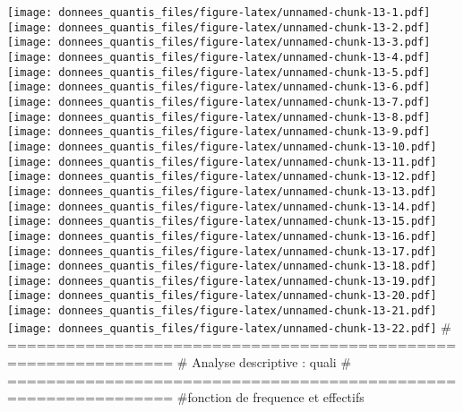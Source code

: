 \documentclass[
]{article}
\begin{document}
\texttt{[image: donnees\_quantis\_files/figure-latex/unnamed-chunk-13-1.pdf]}
\texttt{[image: donnees\_quantis\_files/figure-latex/unnamed-chunk-13-2.pdf]}
\texttt{[image: donnees\_quantis\_files/figure-latex/unnamed-chunk-13-3.pdf]}
\texttt{[image: donnees\_quantis\_files/figure-latex/unnamed-chunk-13-4.pdf]}
\texttt{[image: donnees\_quantis\_files/figure-latex/unnamed-chunk-13-5.pdf]}
\texttt{[image: donnees\_quantis\_files/figure-latex/unnamed-chunk-13-6.pdf]}
\texttt{[image: donnees\_quantis\_files/figure-latex/unnamed-chunk-13-7.pdf]}
\texttt{[image: donnees\_quantis\_files/figure-latex/unnamed-chunk-13-8.pdf]}
\texttt{[image: donnees\_quantis\_files/figure-latex/unnamed-chunk-13-9.pdf]}
\texttt{[image: donnees\_quantis\_files/figure-latex/unnamed-chunk-13-10.pdf]}
\texttt{[image: donnees\_quantis\_files/figure-latex/unnamed-chunk-13-11.pdf]}
\texttt{[image: donnees\_quantis\_files/figure-latex/unnamed-chunk-13-12.pdf]}
\texttt{[image: donnees\_quantis\_files/figure-latex/unnamed-chunk-13-13.pdf]}
\texttt{[image: donnees\_quantis\_files/figure-latex/unnamed-chunk-13-14.pdf]}
\texttt{[image: donnees\_quantis\_files/figure-latex/unnamed-chunk-13-15.pdf]}
\texttt{[image: donnees\_quantis\_files/figure-latex/unnamed-chunk-13-16.pdf]}
\texttt{[image: donnees\_quantis\_files/figure-latex/unnamed-chunk-13-17.pdf]}
\texttt{[image: donnees\_quantis\_files/figure-latex/unnamed-chunk-13-18.pdf]}
\texttt{[image: donnees\_quantis\_files/figure-latex/unnamed-chunk-13-19.pdf]}
\texttt{[image: donnees\_quantis\_files/figure-latex/unnamed-chunk-13-20.pdf]}
\texttt{[image: donnees\_quantis\_files/figure-latex/unnamed-chunk-13-21.pdf]}
\texttt{[image: donnees\_quantis\_files/figure-latex/unnamed-chunk-13-22.pdf]}
\# =============================================================== \#
Analyse descriptive : quali \#
===============================================================
\#fonction de frequence et effectifs
\end{document}
